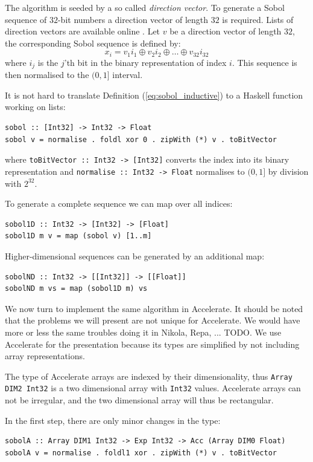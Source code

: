 \documentclass{llncs2e/llncs}
\begin{document}
The algorithm is seeded by a so called \emph{direction vector}. To
generate a Sobol sequence of $32$-bit numbers a direction vector of
length $32$ is required.  Lists of direction vectors are available
online \cite{homepage:sobol:directionvectors}. Let $v$ be a direction
vector of length $32$, the corresponding Sobol sequence is defined by:
\begin{equation}
x_i = v_1i_1 \oplus v_2i_2 \oplus \ldots \oplus v_{32}i_{32}\label{eq:sobol_inductive}
\end{equation}
where $i_j$ is the $j$'th bit in the binary representation of index
$i$. This sequence is then normalised to the $(0,1]$ interval.

It is not hard to translate Definition (\ref{eq:sobol_inductive}) to a
Haskell function working on lists:
\begin{verbatim}
sobol :: [Int32] -> Int32 -> Float
sobol v = normalise . foldl xor 0 . zipWith (*) v . toBitVector
\end{verbatim}
where \verb|toBitVector :: Int32 -> [Int32]| converts the index into
its binary representation and \verb|normalise :: Int32 -> Float|
normalises to $(0,1]$ by division with $2^{32}$.

To generate a complete sequence we can map over all indices:
\begin{verbatim}
sobol1D :: Int32 -> [Int32] -> [Float]
sobol1D m v = map (sobol v) [1..m]
\end{verbatim}
Higher-dimensional sequences can be generated by an additional map:
\begin{verbatim}
sobolND :: Int32 -> [[Int32]] -> [[Float]]
sobolND m vs = map (sobol1D m) vs
\end{verbatim}

We now turn to implement the same algorithm in Accelerate. It should
be noted that the problems we will present are not unique for
Accelerate. We would have more or less the same troubles doing it in
Nikola, Repa, ...  TODO. We use Accelerate for the presentation
because its types are simplified by not including array
representations. 

The type of Accelerate arrays are indexed by their dimensionality,
thus \verb|Array DIM2 Int32| is a two dimensional array with
\verb|Int32| values. Accelerate arrays can not be irregular, and the
two dimensional array will thus be rectangular.

In the first step, there are only minor changes in the type:
\begin{verbatim}
sobolA :: Array DIM1 Int32 -> Exp Int32 -> Acc (Array DIM0 Float)
sobolA v = normalise . foldl1 xor . zipWith (*) v . toBitVector
\end{verbatim}
\end{document}
